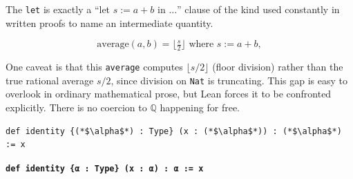\begin{mathreading}

The \texttt{let} is exactly a ``let \(s := a + b\) in \(\ldots\)'' clause of the kind used constantly in written proofs to name an intermediate quantity.

\end{mathreading}

\[
\mathrm{average}(a,b) = \big\lfloor \tfrac{s}{2} \big\rfloor
\text{ where } s := a + b,
\]

One caveat is that this \texttt{average} computes \(\lfloor s/2 \rfloor\) (floor division) rather than the true rational average \(s/2\), since division on \texttt{Nat} is truncating. This gap is easy to overlook in ordinary mathematical prose, but Lean forces it to be confronted explicitly. There is no coercion to \(\mathbb{Q}\) happening for free.

\begin{lstlisting}
def identity {(*$\alpha$*) : Type} (x : (*$\alpha$*)) : (*$\alpha$*) := x
\end{lstlisting}

\textbf{\texttt{def identity \{α : Type\} (x : α) : α := x}}

